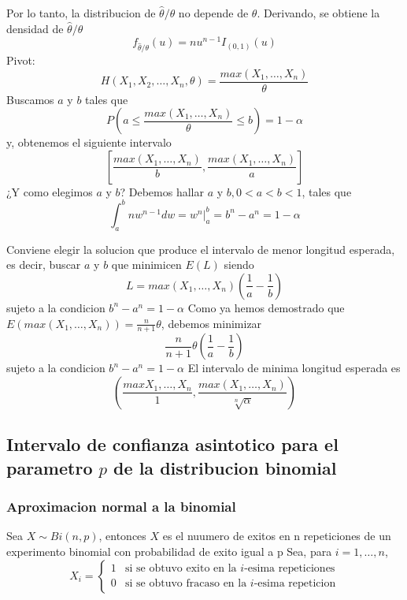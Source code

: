 \documentclass[a4paper]{article}
\begin{document}
Por lo tanto, la distribucion de $\hat{\theta}/\theta$ no depende de $\theta$. Derivando, se obtiene la densidad de $\hat{\theta}/\theta$
\begin{equation*}
    f_{\hat{\theta}/ \theta} (u) = nu^{n-1}I_{(0,1)}(u)
\end{equation*}
Pivot:
\begin{equation*}
    H(X_1,X_2,\dots,X_n, \theta) = \frac{max(X_1,\dots,X_n)}{\theta}
\end{equation*}
Buscamos $a$ y $b$ tales que
\begin{equation*}
    P\left(a \leq \frac{max(X_1,\dots,X_n)}{\theta} \leq b \right) = 1 - \alpha
\end{equation*}
y, obtenemos el siguiente intervalo
\begin{equation*}
    \left[\frac{max(X_1,\dots,X_n)}{b},\frac{max(X_1,\dots,X_n)}{a} \right]
\end{equation*}
¿Y como elegimos $a$ y $b$? Debemos hallar $a$ y $b, 0 < a < b < 1$, tales que
\begin{equation}
    \int_{a}^b nw^{n-1}dw = w^n|_{a}^b = b^n-a^n = 1-\alpha
\end{equation}

Conviene elegir la solucion que produce el intervalo de menor longitud esperada, es decir, buscar $a$ y $b$ que minimicen $E(L)$ siendo
\begin{equation*}
    L = max(X_1,\dots,X_n)\left(\frac{1}{a} - \frac{1}{b}\right)
\end{equation*}
sujeto a la condicion $b^n - a^n = 1 - \alpha$
Como ya hemos demostrado que $E(max(X_1,\dots,X_n)) = \frac{n}{n+1} \theta$, debemos minimizar
\begin{equation*}
    \frac{n}{n+1}\theta\left(\frac{1}{a} - \frac{1}{b}\right)
\end{equation*}
sujeto a la condicion $b^n - a^n = 1-\alpha$
El intervalo de minima longitud esperada es
\begin{equation*}
    \left(\frac{max{X_1,\dots,X_n}}{1}, \frac{max(X_1,\dots,X_n)}{\sqrt[n]{\alpha}}\right)
\end{equation*}

\subsection{Intervalo de confianza asintotico para el parametro $p$ de la distribucion binomial}
\subsubsection{Aproximacion normal a la binomial}
Sea $X \sim Bi(n,p)$, entonces $X$ es el nuumero de exitos en n repeticiones de un experimento binomial con probabilidad de exito igual a p
Sea, para $i = 1,\dots,n$,
\begin{equation*}
    X_i = 
    \begin{cases}
        1 & \text{si se obtuvo exito en la $i$-esima repeticiones} 
        \\
        0 & \text{si se obtuvo fracaso en la $i$-esima repeticion} 
    \end{cases}
\end{equation*}
\end{document}
